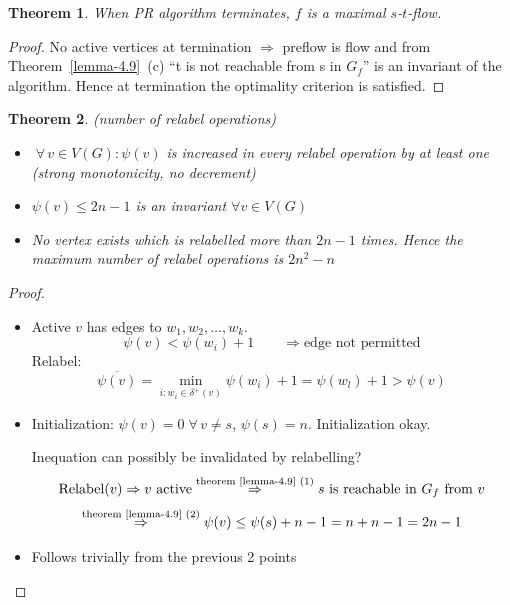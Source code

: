 \documentclass{article}
\newtheorem{theorem}{Theorem}
\newcommand{\flow}[2]{$#1$-$#2$-flow}
\newcommand{\fall}{\;\forall\,}
\begin{document}
\begin{theorem}\label{satz-4.10}
  When PR algorithm terminates, $f$ is a maximal \flow st.
\end{theorem}

\begin{proof}
  No active vertices at termination $\Rightarrow$ preflow is flow and from Theorem~\ref{lemma-4.9}~(c) ``t is not reachable from s in $G_f$'' is an invariant of the algorithm. Hence at termination the optimality criterion is satisfied.
\end{proof}

\begin{theorem}\label{lemma-4.11}
  (number of relabel operations)
  \begin{itemize}
    \item $\fall v \in V(G): \psi(v)$ is increased in every relabel operation by at least one (strong monotonicity, no decrement)
    \item $\psi(v) \leq 2n - 1$ is an invariant $\forall v \in V(G)$
    \item No vertex exists which is relabelled more than $2n - 1$ times. Hence the maximum number of relabel operations is $2n^2 - n$
  \end{itemize}
\end{theorem}

\begin{proof}
  \begin{itemize}
    \item Active $v$ has edges to $w_1, w_2, \ldots, w_k$.
      \[ \psi(v) < \psi(w_i) + 1 \qquad \Rightarrow \text{edge not permitted} \]
      Relabel:
      \[ \overline{\psi(v)} = \min_{i: w_i \in \delta^+(v)} \psi(w_i) + 1 = \psi(w_l) + 1 > \psi(v) \]
    \item Initialization: $\psi(v) = 0 \fall v \neq s$, $\psi(s) = n$. Initialization okay.

      Inequation can possibly be invalidated by relabelling?
      \[
        \operatorname{Relabel}(v)
          \Rightarrow v \text{ active}
          \stackrel{\text{theorem~\ref{lemma-4.9} (1)}}{\Rightarrow} s \text{ is reachable in $G_f$ from } v
      \] \[
        \stackrel{\text{theorem~\ref{lemma-4.9} (2)}}{\Rightarrow}
          \psi(v) \leq \psi(s) + n - 1
          = n + n - 1 = 2n - 1
      \]
    \item Follows trivially from the previous 2 points
  \end{itemize}
\end{proof}
\end{document}
